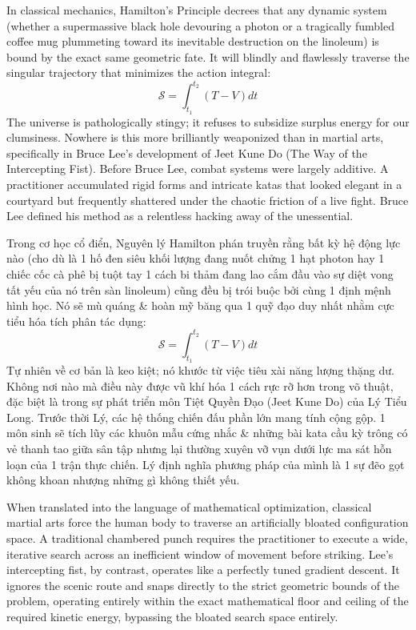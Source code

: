\documentclass[11pt]{article}
\begin{document}
In classical mechanics, Hamilton's Principle decrees that any dynamic system (whether a supermassive black hole devouring a photon or a tragically fumbled coffee mug plummeting toward its inevitable destruction on the linoleum) is bound by the exact same geometric fate. It will blindly and flawlessly traverse the singular trajectory that minimizes the action integral:
\[ \mathcal{S} = \int_{t_1}^{t_2} \left( T - V \right) dt \]
The universe is pathologically stingy; it refuses to subsidize surplus energy for our clumsiness. Nowhere is this more brilliantly weaponized than in martial arts, specifically in Bruce Lee's development of Jeet Kune Do (The Way of the Intercepting Fist). Before Bruce Lee, combat systems were largely additive. A practitioner accumulated rigid forms and intricate katas that looked elegant in a courtyard but frequently shattered under the chaotic friction of a live fight. Bruce Lee defined his method as a relentless hacking away of the unessential.

Trong cơ học cổ điển, Nguyên lý Hamilton phán truyền rằng bất kỳ hệ động lực nào (cho dù là 1 hố đen siêu khối lượng đang nuốt chửng 1 hạt photon hay 1 chiếc cốc cà phê bị tuột tay 1 cách bi thảm đang lao cắm đầu vào sự diệt vong tất yếu của nó trên sàn linoleum) cũng đều bị trói buộc bởi cùng 1 định mệnh hình học. Nó sẽ mù quáng \& hoàn mỹ băng qua 1 quỹ đạo duy nhất nhằm cực tiểu hóa tích phân tác dụng:
\[ \mathcal{S} = \int_{t_1}^{t_2} \left( T - V \right) dt \]
Tự nhiên về cơ bản là keo kiệt; nó khước từ việc tiêu xài năng lượng thặng dư. Không nơi nào mà điều này được vũ khí hóa 1 cách rực rỡ hơn trong võ thuật, đặc biệt là trong sự phát triển môn Tiệt Quyền Đạo (Jeet Kune Do) của Lý Tiểu Long. Trước thời Lý, các hệ thống chiến đấu phần lớn mang tính cộng gộp. 1 môn sinh sẽ tích lũy các khuôn mẫu cứng nhắc \& những bài kata cầu kỳ trông có vẻ thanh tao giữa sân tập nhưng lại thường xuyên vỡ vụn dưới lực ma sát hỗn loạn của 1 trận thực chiến. Lý định nghĩa phương pháp của mình là 1 sự đẽo gọt không khoan nhượng những gì không thiết yếu.

When translated into the language of mathematical optimization, classical martial arts force the human body to traverse an artificially bloated configuration space. A traditional chambered punch requires the practitioner to execute a wide, iterative search across an inefficient window of movement before striking. Lee's intercepting fist, by contrast, operates like a perfectly tuned gradient descent. It ignores the scenic route and snaps directly to the strict geometric bounds of the problem, operating entirely within the exact mathematical floor and ceiling of the required kinetic energy, bypassing the bloated search space entirely.
\end{document}
